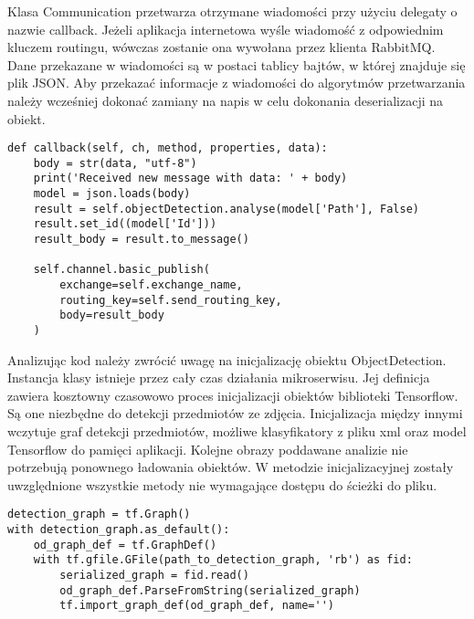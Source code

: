 \begin{itemize}
Klasa Communication przetwarza otrzymane wiadomości przy użyciu delegaty o nazwie callback. Jeżeli aplikacja internetowa wyśle wiadomość z odpowiednim kluczem routingu, wówczas zostanie ona wywołana przez klienta RabbitMQ. Dane przekazane w wiadomości są w postaci tablicy bajtów, w której znajduje się plik JSON. Aby przekazać informacje z wiadomości do algorytmów przetwarzania należy wcześniej dokonać zamiany na napis w celu dokonania deserializacji na obiekt.


\begin{lstlisting}[caption={Odbieranie wiadomości w środowisku Python.}]
def callback(self, ch, method, properties, data):
	body = str(data, "utf-8")
	print('Received new message with data: ' + body)
	model = json.loads(body)
	result = self.objectDetection.analyse(model['Path'], False)
	result.set_id((model['Id']))
	result_body = result.to_message()
	
	self.channel.basic_publish(
		exchange=self.exchange_name,
		routing_key=self.send_routing_key,
		body=result_body
	)
\end{lstlisting}

Analizując kod należy zwrócić uwagę na inicjalizację obiektu ObjectDetection. Instancja klasy istnieje przez cały czas działania mikroserwisu. Jej definicja zawiera kosztowny czasowowo proces inicjalizacji obiektów biblioteki Tensorflow. Są one niezbędne do detekcji przedmiotów ze zdjęcia. Inicjalizacja między innymi wczytuje graf detekcji przedmiotów, możliwe klasyfikatory z pliku xml oraz model Tensorflow do pamięci aplikacji. Kolejne obrazy poddawane analizie nie potrzebują ponownego ładowania obiektów. W metodzie inicjalizacyjnej zostały uwzględnione wszystkie metody nie wymagające dostępu do ścieżki do pliku.
\newline
\begin{lstlisting}[caption={Fragment inicjalizacji obiektów biblioteki Tensorflow.}]
detection_graph = tf.Graph()
with detection_graph.as_default():
	od_graph_def = tf.GraphDef()
	with tf.gfile.GFile(path_to_detection_graph, 'rb') as fid:
		serialized_graph = fid.read()
		od_graph_def.ParseFromString(serialized_graph)
		tf.import_graph_def(od_graph_def, name='')
	

\end{lstlisting}
\end{itemize}
